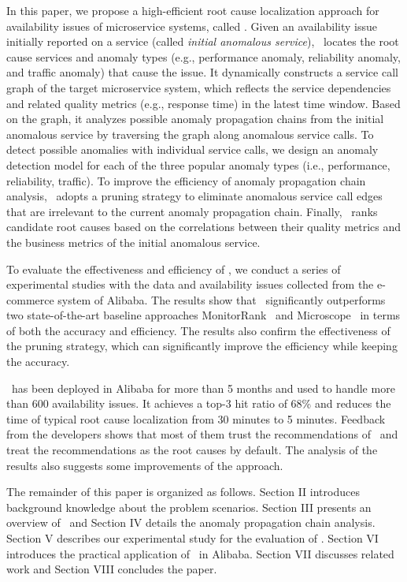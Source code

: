 In this paper, we propose a high-efficient root cause localization approach for availability issues of microservice systems, called \app.
Given an availability issue initially reported on a service (called \textit{initial anomalous service}), \app~locates the root cause services and anomaly types (e.g., performance anomaly, reliability anomaly, and traffic anomaly) that cause the issue.
It dynamically constructs a service call graph of the target microservice system, which reflects the service dependencies and related quality metrics (e.g., response time) in the latest time window.
Based on the graph, it analyzes possible anomaly propagation chains from the initial anomalous service by traversing the graph along anomalous service calls.
To detect possible anomalies with individual service calls, we design an anomaly detection model for each of the three popular anomaly types (i.e., performance, reliability, traffic).
To improve the efficiency of anomaly propagation chain analysis, \app~adopts a pruning strategy to eliminate anomalous service call edges that are irrelevant to the current anomaly propagation chain.
Finally, \app~ranks candidate root causes based on the correlations between their quality metrics and the business metrics of the initial anomalous service.

To evaluate the effectiveness and efficiency of \app , we conduct a series of experimental studies with the data and availability issues collected from the e-commerce system of Alibaba.
The results show that \app~significantly outperforms two state-of-the-art baseline approaches MonitorRank~\cite{cscs2013monitorRank} and Microscope~\cite{ICSOC2018Microscope} in terms of both the accuracy and efficiency.
The results also confirm the effectiveness of the pruning strategy, which can significantly improve the efficiency while keeping the accuracy.

\app~has been deployed in Alibaba for more than 5 months and used to handle more than 600 availability issues.
It achieves a top-3 hit ratio of 68\% and reduces the time of typical root cause localization from 30 minutes to 5 minutes.
Feedback from the developers shows that most of them trust the recommendations of \app~and treat the recommendations as the root causes by default.
The analysis of the results also suggests some improvements of the approach.

The remainder of this paper is organized as follows.
Section II introduces background knowledge about the problem scenarios.
Section III presents an overview of \app~and Section IV details the anomaly propagation chain analysis.
Section V describes our experimental study for the evaluation of \app.
Section VI introduces the practical application of \app~in Alibaba.
Section VII discusses related work and Section VIII concludes the paper.


